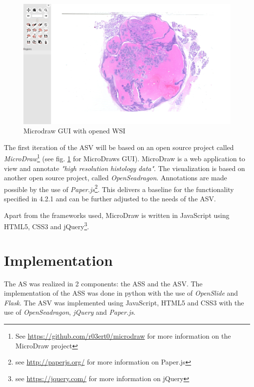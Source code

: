 \begin{figure}[H]
	\begin{center}
		\includegraphics[scale=0.2]{img/microdrawUI.png}
		\caption{Microdraw GUI with opened WSI}
		\label{fig4_microdrawUI}
	\end{center}
\end{figure}

The first iteration of the ASV will be based on an open source project called \emph{MicroDraw}\footnote{See \url{https://github.com/r03ert0/microdraw} for more information on the MicroDraw project} (see fig. \ref{fig4_microdrawUI} for MicroDraws GUI).  MicroDraw is a web application to view and annotate \emph{"high resolution histology data"}\cite{web:microdraw2}. The visualization is based on another open source project, called \emph{OpenSeadragon}\cite{web:openseadragon}. Annotations are made possible by the use of \emph{Paper.js}\footnote{see \url{http://paperjs.org/} for more information on Paper.js}. This delivers a baseline for the functionality specified in 4.2.1 and can be further adjusted to the needs of the ASV.

Apart from the frameworks used, MicroDraw is written in JavaScript using HTML5, CSS3 and jQuery\footnote{see \url{https://jquery.com/} for more information on jQuery}.


\section{Implementation}
The AS was realized in 2 components: the ASS and the ASV. The implementation of the ASS was done in python with the use of \emph{OpenSlide} and \emph{Flask}. The ASV was implemented using JavaScript, HTML5 and CSS3 with the use of \emph{OpenSeadragon}, \emph{jQuery} and \emph{Paper.js}.

